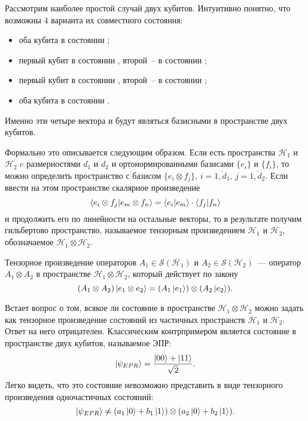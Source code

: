 Рассмотрим наиболее простой случай двух кубитов. Интуитивно понятно, что возможны 4 варианта их совместного состояния:
\begin{itemize}
  \item оба кубита в состоянии ;
  \item первый кубит в состоянии , второй~-- в состоянии ;
  \item первый кубит в состоянии , второй~-- в состоянии ;
  \item оба кубита в состоянии .
\end{itemize}
Именно эти четыре вектора и будут являться базисными в пространстве двух кубитов.

Формально это описывается следующим образом. Если есть пространства $\mathcal{H}_1$ и $\mathcal{H}_2$ c размерностями $d_1$ и $d_2$ и ортонормированными базисами $\{e_i\}$ и $\{f_i\}$, то можно определить пространство с базисом $\{e_i \otimes f_j\},\, i = \overline{1,d_1},\, j = \overline{1,d_2}$. Если ввести на этом пространстве скалярное произведение
\begin{equation}
  \left\langle e_i \otimes f_j|e_m \otimes f_n\right\rangle = \left\langle e_i|e_m\right\rangle \cdot \left\langle f_j|f_n\right\rangle 
\end{equation}
 и продолжить его по линейности на остальные векторы, то в результате получим гильбертово пространство, называемое тензорным произведением $\mathcal{H}_1$ и $\mathcal{H}_2$, обозначаемое $\mathcal{H}_1 \otimes \mathcal{H}_2$.

Тензорное произведение операторов $A_1 \in \mathcal{S}(\mathcal{H}_1)$ и $A_2 \in \mathcal{S}(\mathcal{H}_2)$~--- оператор $A_1 \otimes A_2$ в пространстве $\mathcal{H}_1 \otimes \mathcal{H}_2$, который действует по закону
\begin{equation} 
  (A_1 \otimes A_2)\left| e_1 \otimes e_2 \right\rangle = (A_1\left| e_1 \right\rangle)\otimes(A_2\left| e_2 \right\rangle). 
\end{equation}

Встает вопрос о том, всякое ли состояние в пространстве $\mathcal{H}_1 \otimes \mathcal{H}_2$ можно задать как тензорное произведение состояний из частичных пространств $\mathcal{H}_1$ и $\mathcal{H}_2$. Ответ на него отрицателен.
Классическим контрпримером является состояние в пространстве двух кубитов, называемое ЭПР:
\begin{equation}\label{epr_state}  
  \left| \psi_{EPR} \right\rangle = \frac{\left| 00 \right\rangle + \left| 11 \right\rangle}{\sqrt{2}}.
\end{equation}
Легко видеть, что это состояние невозможно представить в виде тензорного произведения одночастичных состояний: 
\begin{equation}
  \left| \psi_{EPR} \right\rangle \neq (a_1\left| 0 \right\rangle + b_1\left| 1 \right\rangle) \otimes (a_2 \left| 0 \right\rangle + b_2 \left| 1 \right\rangle).
\end{equation}

